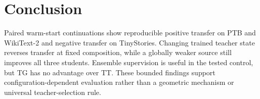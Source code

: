 \section{Conclusion}\label{sec:conclusion}

Paired warm-start continuations show reproducible positive transfer on PTB and WikiText-2 and negative transfer on TinyStories. Changing trained teacher state reverses transfer at fixed composition, while a globally weaker source still improves all three students. Ensemble supervision is useful in the tested control, but TG has no advantage over TT. These bounded findings support configuration-dependent evaluation rather than a geometric mechanism or universal teacher-selection rule.
\label{end:main-text}
